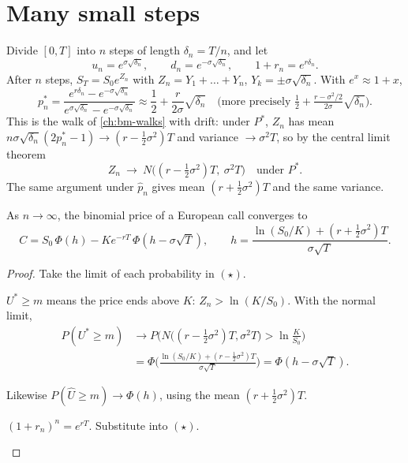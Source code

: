 \section{Many small steps}

Divide $[0,T]$ into $n$ steps of length $\delta_n=T/n$, and let
\[
  u_n=e^{\sigma\sqrt{\delta_n}},\qquad d_n=e^{-\sigma\sqrt{\delta_n}},\qquad 1+r_n=e^{r\delta_n}.
\]
After $n$ steps, $S_T=S_0e^{Z_n}$ with $Z_n=Y_1+\dots+Y_n$, $Y_k=\pm\sigma\sqrt{\delta_n}$. With $e^x\approx1+x$,
\[
  p_n^*=\frac{e^{r\delta_n}-e^{-\sigma\sqrt{\delta_n}}}{e^{\sigma\sqrt{\delta_n}}-e^{-\sigma\sqrt{\delta_n}}}\approx\frac12+\frac{r}{2\sigma}\sqrt{\delta_n}\quad\Big(\text{more precisely }\tfrac12+\tfrac{r-\sigma^2/2}{2\sigma}\sqrt{\delta_n}\Big).
\]
This is the walk of \cref{ch:bm-walks} with drift: under $P^*$, $Z_n$ has mean $n\sigma\sqrt{\delta_n}(2p^*_n-1)\to(r-\frac12\sigma^2)T$ and variance $\to\sigma^2T$, so by the central limit theorem
\[
  Z_n\ \longrightarrow\ N\big((r-\tfrac12\sigma^2)T,\ \sigma^2T\big)\quad\text{under }P^*.
\]
The same argument under $\hat p_n$ gives mean $(r+\frac12\sigma^2)T$ and the same variance.

\begin{theorem}
\label{thm:bs}
As $n\to\infty$, the binomial price of a European call converges to
\[
  \boxed{\;C=S_0\,\Phi(h)-Ke^{-rT}\,\Phi(h-\sigma\sqrt T),\qquad h=\frac{\ln(S_0/K)+(r+\frac12\sigma^2)T}{\sigma\sqrt T}.\;}
\]
\end{theorem}
\begin{proof}
Take the limit of each probability in $(\star)$.
\begin{steps}
  \item $U^*\ge m$ means the price ends above $K$: $Z_n>\ln(K/S_0)$. With the normal limit,
  \[
    \begin{aligned}
    P(U^*\ge m)&\to P\Big(N\big((r-\tfrac12\sigma^2)T,\sigma^2T\big)>\ln\tfrac{K}{S_0}\Big)\\
    &=\Phi\Big(\frac{\ln(S_0/K)+(r-\frac12\sigma^2)T}{\sigma\sqrt T}\Big)=\Phi(h-\sigma\sqrt T).
    \end{aligned}
  \]
  \item Likewise $P(\hat U\ge m)\to\Phi(h)$, using the mean $(r+\frac12\sigma^2)T$.
  \item $(1+r_n)^n=e^{rT}$. Substitute into $(\star)$. \qedhere
\end{steps}
\end{proof}

